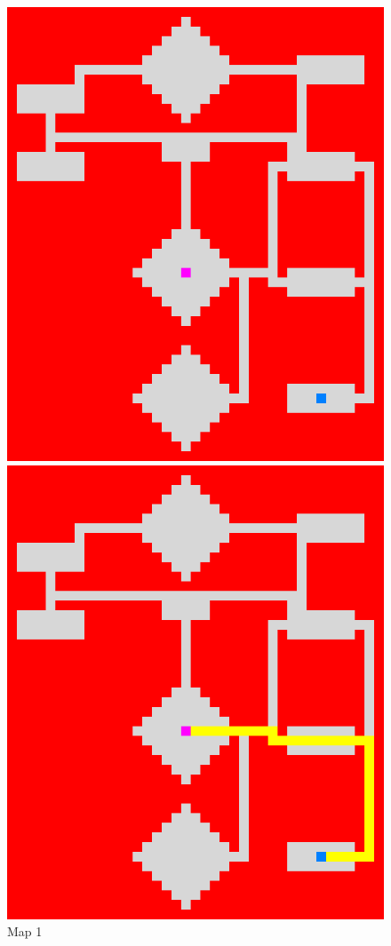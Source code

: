 \documentclass{article}
\begin{document}
\begin{figure}[h!!!!]
	\centering
	\begin{minipage}{0.4\textwidth}
		\includegraphics[width=\textwidth]{images/map1}
    		\caption{Map 1}
	\end{minipage}
	\hfill
	\begin{minipage}{0.4\textwidth}
		\includegraphics[width=\textwidth]{images/map1_solution}

\end{minipage}
\end{figure}
\end{document}
